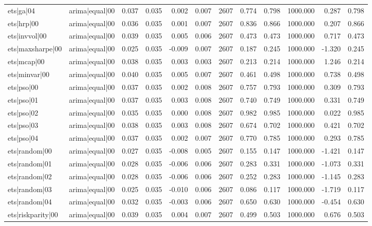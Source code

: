 \begin{table}
\begin{tabular}{llrrrrrrrrrr}
ets|ga|04 & arima|equal|00 & 0.037 & 0.035 & 0.002 & 0.007 & 2607 & 0.774 & 0.798 & 1000.000 & 0.287 & 0.798 \\
ets|hrp|00 & arima|equal|00 & 0.036 & 0.035 & 0.001 & 0.007 & 2607 & 0.836 & 0.866 & 1000.000 & 0.207 & 0.866 \\
ets|invvol|00 & arima|equal|00 & 0.039 & 0.035 & 0.005 & 0.006 & 2607 & 0.473 & 0.473 & 1000.000 & 0.717 & 0.473 \\
ets|maxsharpe|00 & arima|equal|00 & 0.025 & 0.035 & -0.009 & 0.007 & 2607 & 0.187 & 0.245 & 1000.000 & -1.320 & 0.245 \\
ets|mcap|00 & arima|equal|00 & 0.038 & 0.035 & 0.003 & 0.003 & 2607 & 0.213 & 0.214 & 1000.000 & 1.246 & 0.214 \\
ets|minvar|00 & arima|equal|00 & 0.040 & 0.035 & 0.005 & 0.007 & 2607 & 0.461 & 0.498 & 1000.000 & 0.738 & 0.498 \\
ets|pso|00 & arima|equal|00 & 0.037 & 0.035 & 0.002 & 0.008 & 2607 & 0.757 & 0.793 & 1000.000 & 0.309 & 0.793 \\
ets|pso|01 & arima|equal|00 & 0.037 & 0.035 & 0.003 & 0.008 & 2607 & 0.740 & 0.749 & 1000.000 & 0.331 & 0.749 \\
ets|pso|02 & arima|equal|00 & 0.035 & 0.035 & 0.000 & 0.008 & 2607 & 0.982 & 0.985 & 1000.000 & 0.022 & 0.985 \\
ets|pso|03 & arima|equal|00 & 0.038 & 0.035 & 0.003 & 0.008 & 2607 & 0.674 & 0.702 & 1000.000 & 0.421 & 0.702 \\
ets|pso|04 & arima|equal|00 & 0.037 & 0.035 & 0.002 & 0.007 & 2607 & 0.770 & 0.785 & 1000.000 & 0.293 & 0.785 \\
ets|random|00 & arima|equal|00 & 0.027 & 0.035 & -0.008 & 0.005 & 2607 & 0.155 & 0.147 & 1000.000 & -1.421 & 0.147 \\
ets|random|01 & arima|equal|00 & 0.028 & 0.035 & -0.006 & 0.006 & 2607 & 0.283 & 0.331 & 1000.000 & -1.073 & 0.331 \\
ets|random|02 & arima|equal|00 & 0.028 & 0.035 & -0.006 & 0.006 & 2607 & 0.252 & 0.283 & 1000.000 & -1.145 & 0.283 \\
ets|random|03 & arima|equal|00 & 0.025 & 0.035 & -0.010 & 0.006 & 2607 & 0.086 & 0.117 & 1000.000 & -1.719 & 0.117 \\
ets|random|04 & arima|equal|00 & 0.032 & 0.035 & -0.003 & 0.006 & 2607 & 0.650 & 0.630 & 1000.000 & -0.454 & 0.630 \\
ets|riskparity|00 & arima|equal|00 & 0.039 & 0.035 & 0.004 & 0.007 & 2607 & 0.499 & 0.503 & 1000.000 & 0.676 & 0.503 \\

\end{tabular}
\end{table}
